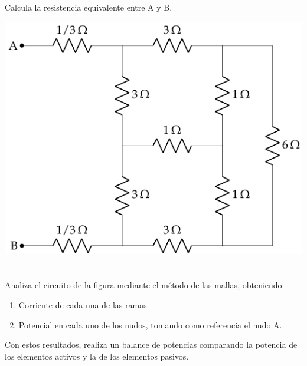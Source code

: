 \documentclass[12pt]{article}
\begin{document}
\section{}

Calcula la resistencia equivalente entre A y B.

\includegraphics{figs/CircuitoResistivo_FM.pdf}

\section{}

Analiza el circuito de la figura mediante el método de las mallas, obteniendo:
\begin{enumerate}
\item Corriente de cada una de las ramas
\item Potencial en cada uno de los nudos, tomando como referencia el
  nudo A.
\end{enumerate}

Con estos resultados, realiza un balance de potencias comparando la potencia de los elementos activos y la de los elementos pasivos.
\end{document}
